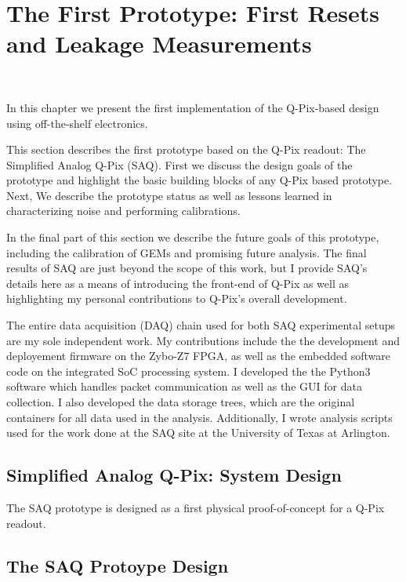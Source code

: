 \chapter{The First Prototype: First Resets and Leakage Measurements}~\label{chap:saq}

In this chapter we present the first implementation of the Q-Pix-based design using off-the-shelf electronics.

This section describes the first prototype based on the Q-Pix readout: The Simplified Analog Q-Pix (SAQ).
First we discuss the design goals of the prototype and highlight the basic building blocks of any Q-Pix based prototype.
Next, We describe the prototype status as well as lessons learned in characterizing noise and performing calibrations.

In the final part of this section we describe the future goals of this prototype, including the calibration of GEMs and promising future analysis.
The final results of SAQ are just beyond the scope of this work, but I provide SAQ's details here as a means of introducing the front-end of Q-Pix as well as highlighting my personal contributions to Q-Pix's overall development.

The entire data acquisition (DAQ) chain used for both SAQ experimental setups are my sole independent work.
My contributions include the the development and deployement firmware on the Zybo-Z7 FPGA, as well as the embedded software code on the integrated SoC processing system.
I developed the the Python3 software which handles packet communication as well as the GUI for data collection.
I also developed the data storage trees, which are the original containers for all data used in the analysis. 
Additionally, I wrote analysis scripts used for the work done at the SAQ site at the University of Texas at Arlington.

\section{Simplified Analog Q-Pix: System Design}

The SAQ prototype is designed as a first physical proof-of-concept for a Q-Pix readout.

\section{The SAQ Protoype Design}

